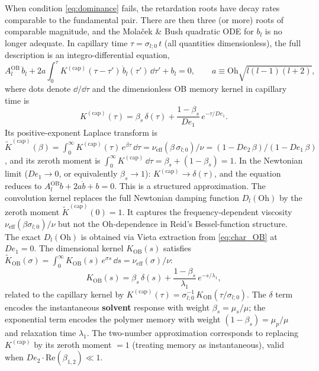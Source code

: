 When condition \eqref{eq:dominance} fails, the retardation roots have decay
rates comparable to the fundamental pair. There are then three (or more) roots
of comparable magnitude, and the Mola\v{c}ek \& Bush quadratic ODE for $b_l$
is no longer adequate. In capillary time $\tau = \sigma_{l;0}\,t$ (all quantities
dimensionless), the full description is an integro-differential equation,
\begin{equation}
  A_l^{\mathrm{OB}}\,\ddot{b}_l
  + 2a
    \int_0^\tau K^{(\mathrm{cap})}(\tau-\tau')\,\dot{b}_l(\tau')\,\dd\tau'
  + b_l = 0, \qquad a \equiv \mathrm{Oh}\sqrt{l(l-1)(l+2)},
  \label{eq:integrodiff_OB}
\end{equation}
where dots denote $\dd/\dd\tau$ and the dimensionless OB memory kernel in
capillary time is
\begin{equation}
  K^{(\mathrm{cap})}(\tau) = \beta_s\,\delta(\tau)
  + \frac{1-\beta_s}{De_1}\,e^{-\tau/De_1}.
  \label{eq:OB_kernel_cap}
\end{equation}
Its positive-exponent Laplace transform is
$\tilde{K}^{(\mathrm{cap})}(\beta)
  = \int_0^\infty K^{(\mathrm{cap})}(\tau)\,e^{\beta\tau}\,\dd\tau
  = \nu_{\mathrm{eff}}(\beta\,\sigma_{l;0})/\nu
  = (1 - De_2\,\beta)/(1 - De_1\,\beta)$,
and its zeroth moment is $\int_0^\infty K^{(\mathrm{cap})}\,\dd\tau = \beta_s + (1-\beta_s) = 1$.
In the Newtonian limit ($De_1\to 0$, or equivalently $\beta_s\to 1$):
$K^{(\mathrm{cap})}\to\delta(\tau)$, and the equation reduces to
$A_l^{\mathrm{OB}}\ddot{b}+2a\dot{b}+b=0$.
This is a structured approximation. The convolution kernel replaces the
full Newtonian damping function $D_l(\mathrm{Oh})$ by the zeroth moment
$\tilde{K}^{(\mathrm{cap})}(0)=1$. It captures the frequency-dependent viscosity
$\nu_{\mathrm{eff}}(\beta\sigma_{l;0})/\nu$ but not the Oh-dependence in
Reid's Bessel-function structure. The exact $D_l(\mathrm{Oh})$ is obtained via
Vieta extraction from \eqref{eq:char_OB} at $De_1=0$.
The dimensional kernel $K_{\mathrm{OB}}(s)$ satisfies
$\tilde{K}_{\mathrm{OB}}(\sigma)
  = \int_0^\infty K_{\mathrm{OB}}(s)\,e^{\sigma s}\,\dd s
  = \nu_{\mathrm{eff}}(\sigma)/\nu$:
\begin{equation}
  K_{\mathrm{OB}}(s) = \beta_s\,\delta(s)
  + \frac{1-\beta_s}{\lambda_1}\,e^{-s/\lambda_1},
  \label{eq:OB_kernel}
\end{equation}
related to the capillary kernel by
$K^{(\mathrm{cap})}(\tau) = \sigma_{l;0}^{-1}\,K_{\mathrm{OB}}(\tau/\sigma_{l;0})$.
The $\delta$ term encodes the instantaneous \textbf{solvent} response with
weight $\beta_s = \mu_s/\mu$; the exponential term encodes the polymer memory
with weight $(1-\beta_s) = \mu_p/\mu$ and relaxation time $\lambda_1$.
The two-number approximation corresponds to replacing $K^{(\mathrm{cap})}$ by
its zeroth moment $= 1$ (treating memory as instantaneous), valid when
$De_2 \cdot \mathrm{Re}(\beta_{1,2}) \ll 1$.

